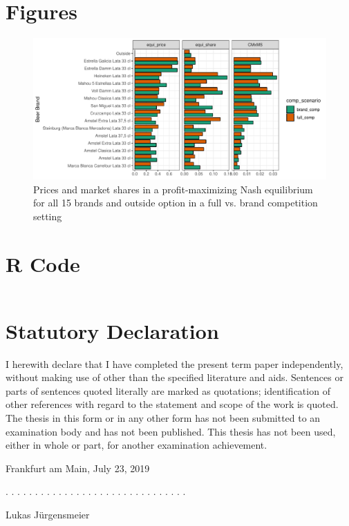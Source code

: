 \documentclass[12pt,a4paper]{article}
\begin{document}
\clearpage
\appendix
\section{Figures}
\begin{figure}[ht]
	\centering
  \includegraphics[scale = 0.7]{figures/bar_price_share_full_brand_15.pdf}
	\caption{Prices and market shares in a profit-maximizing Nash equilibrium for all 15 brands and outside option in a full vs. brand competition setting}
	\label{fig_bar_fifteen}
\end{figure}

\section{R Code}

\begin{lstlisting}[language=R,caption={Estimation Code}, label=lst:estim]


\end{lstlisting}


\clearpage


\newpage
\thispagestyle{empty}
\section*{Statutory Declaration}

I herewith declare that I have completed the present term paper independently, without making use of
other than the specified literature and aids. Sentences or parts of sentences quoted literally are
marked as quotations; identification of other references with regard to the statement and scope of
the work is quoted. The thesis in this form or in any other form has not been submitted to an examination body and has not been published.
This thesis has not been used, either in whole or part, for another examination achievement.

\vspace{1cm}

Frankfurt am Main, July 23, 2019
\vspace{2cm}

. . . . . . . . . . . . . . . . . . . . . . . . . . . . . . .
\vspace{0.1cm}

Lukas J\"urgensmeier
\end{document}
